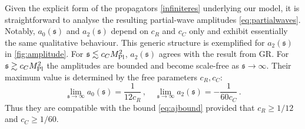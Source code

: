 \documentclass[aps,prl,onecolumn,superscriptaddress,longbibliography,nofootinbib,floatfix,showpacs,12pt]{revtex4-1}
\newcommand{\GR}{{\small GR}}
\newcommand{\be}{\begin{equation}}
\newcommand{\ee}{\end{equation}}
\newcommand{\mans}{\ensuremath{\mathfrak{s}}}
\newcommand{\modelname}{model}
\begin{document}
Given the explicit form of the propagators \eqref{infiniteres} underlying our \modelname{}, it is straightforward to analyse the resulting partial-wave amplitudes \eqref{eq:partialwaves}.
Notably, $a_0(\mans)$ and $a_2(\mans)$ depend on $c_R$ and $c_C$ only and exhibit essentially the same qualitative behaviour.
This generic structure is exemplified for $a_2(\mans)$ in \autoref{fig:amplitude}. 
 For $\mans \lesssim c_C M_{\rm Pl}^2$, $a_2(\mans)$ agrees with the result from \GR{}.
 For $\mans \gtrsim  c_C M_{\rm Pl}^2$ the amplitudes are bounded and become scale-free as $\mans \to \infty$.
 Their maximum value is determined by the free parameters $c_R, c_C$:
 \be
 \lim_{\mans \rightarrow \infty} a_0(\mans) = \frac{1}{12c_R} \, , \quad 
 \lim_{\mans \rightarrow \infty} a_2(\mans) = - \frac{1}{60c_C}  \, . 
 \ee
Thus they are compatible with the bound \eqref{eq:ajbound} provided that $c_R \ge 1/12$ and $c_C \ge 1/60$. 
 
\end{document}
